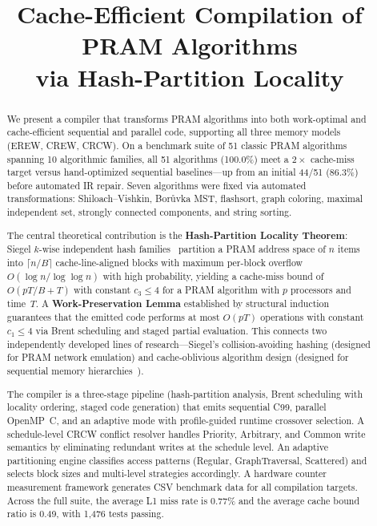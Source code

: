 \documentclass[11pt]{article}
\title{Cache-Efficient Compilation of PRAM Algorithms\\
via Hash-Partition Locality}
\date{}
\begin{document}
\maketitle

\begin{abstract}
We present a compiler that transforms PRAM algorithms into both
work-optimal and cache-efficient sequential and parallel code, supporting
all three memory models (EREW, CREW, CRCW).  On a benchmark suite of 51
classic PRAM algorithms spanning 10 algorithmic families, all
51 algorithms (100.0\%) meet a $2\times$ cache-miss target versus
hand-optimized sequential baselines---up from an initial 44/51 (86.3\%)
before automated IR repair.  Seven algorithms were fixed via automated
transformations: Shiloach--Vishkin, Bor\r{u}vka MST, flashsort, graph
coloring, maximal independent set, strongly connected components, and
string sorting.

The central theoretical contribution is the \textbf{Hash-Partition
Locality Theorem}: Siegel $k$-wise independent hash
families~\cite{siegel2004universal} partition a PRAM address space of $n$
items into $\lceil n/B \rceil$ cache-line-aligned blocks with maximum
per-block overflow $O(\log n / \log\log n)$ with high probability,
yielding a cache-miss bound of $O(pT/B + T)$ with constant $c_3 \le 4$
for a PRAM algorithm with $p$ processors and time~$T$.  A
\textbf{Work-Preservation Lemma} established by structural induction
guarantees that the emitted code performs at most $O(pT)$ operations with
constant $c_1 \le 4$ via Brent scheduling and staged partial evaluation.
This connects two independently developed lines of
research---Siegel's collision-avoiding hashing (designed for PRAM
network emulation) and cache-oblivious algorithm design (designed for
sequential memory hierarchies~\cite{frigo1999cache}).

The compiler is a three-stage pipeline (hash-partition analysis, Brent
scheduling with locality ordering, staged code generation) that emits
sequential C99, parallel OpenMP~C, and an adaptive mode with
profile-guided runtime crossover selection.  A schedule-level CRCW
conflict resolver handles Priority, Arbitrary, and Common write semantics
by eliminating redundant writes at the schedule level.  An adaptive
partitioning engine classifies access patterns (Regular, GraphTraversal,
Scattered) and selects block sizes and multi-level strategies accordingly.
A hardware counter measurement framework generates CSV benchmark data for
all compilation targets.  Across the full suite, the average L1 miss rate
is 0.77\% and the average cache bound ratio is 0.49, with 1,476 tests
passing.
\end{abstract}
\end{document}
